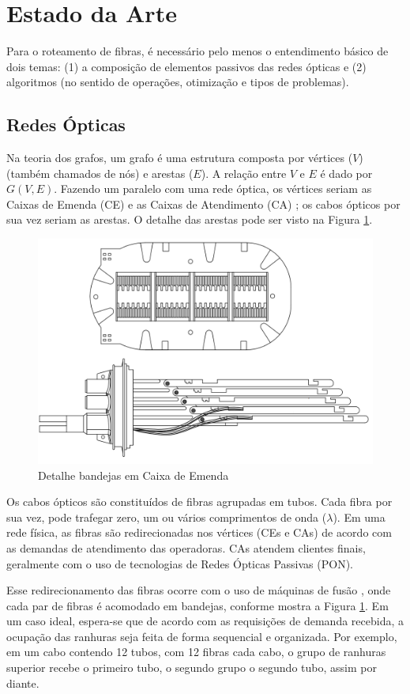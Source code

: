 \section{Estado da Arte} \label{sec:fundaments}

Para o roteamento de fibras, é necessário pelo menos o entendimento básico de
dois temas: (1) a composição de elementos passivos das redes ópticas e (2)
algoritmos (no sentido de operações, otimização e tipos de problemas).

\subsection{Redes Ópticas}

Na teoria dos grafos, um grafo é uma estrutura composta por vértices ($V$)
(também chamados de nós) e arestas ($E$). A relação entre $V$ e $E$ é dado por
$G(V,E)$. Fazendo um paralelo com uma rede óptica, os vértices seriam as Caixas
de Emenda (CE) e as Caixas de Atendimento (CA) \cite{maeda2009optical}; os
cabos ópticos por sua vez seriam as arestas. O detalhe das arestas pode ser
visto na Figura \ref{fig:ce_detalhe_bandejas}.

\begin{figure}[ht]
  \centering
	\includegraphics[width=.5\textwidth]{./images/caixa_emenda_detalhe_bandejas.png}
	\caption{Detalhe bandejas em Caixa de Emenda}
	\label{fig:ce_detalhe_bandejas}
\end{figure}

Os cabos ópticos são constituídos de fibras agrupadas em tubos. Cada fibra por
sua vez, pode trafegar zero, um ou vários comprimentos de onda ($\lambda$).
Em uma rede física, as fibras são redirecionadas nos vértices (CEs e CAs) de
acordo com as demandas de atendimento das operadoras. CAs atendem clientes finais,
geralmente com o uso de tecnologias de Redes Ópticas Passivas (PON).

Esse redirecionamento das fibras ocorre com o uso de máquinas de fusão
\cite{maeda2009optical}, onde cada par de fibras é acomodado em bandejas,
conforme mostra a Figura \ref{fig:ce_detalhe_bandejas}. Em um caso ideal,
espera-se que de acordo com as requisições de demanda recebida, a ocupação das
ranhuras seja feita de forma sequencial e organizada. Por exemplo, em um cabo
contendo 12 tubos, com 12 fibras cada cabo, o grupo de ranhuras superior recebe
o primeiro tubo, o segundo grupo o segundo tubo, assim por diante.

